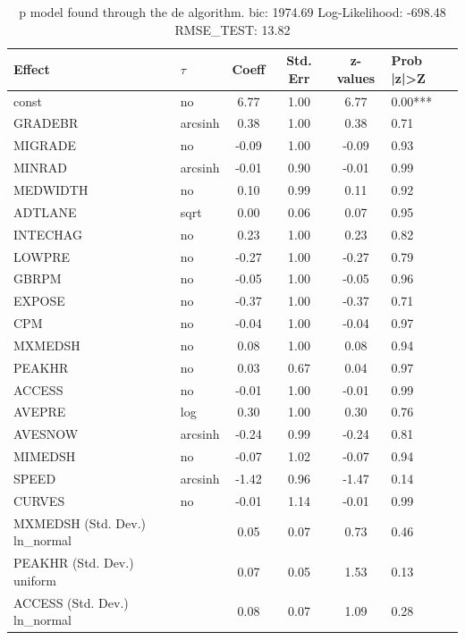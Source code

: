 \begin{table}
	\caption{p model found through the de algorithm. bic: 1974.69 Log-Likelihood: -698.48 RMSE_TEST: 13.82}
	\begin{center}
		\begin{tabular}{|l|l|c|c|c|l|}
			\hline
			Effect & $\tau$ & Coeff & Std. Err & z-values & Prob |z|>Z \\
			\hline
			const & no & 6.77 & 1.00 & 6.77 & 0.00*** \\
			\hline
			GRADEBR & arcsinh & 0.38 & 1.00 & 0.38 & 0.71 \\
			\hline
			MIGRADE & no & -0.09 & 1.00 & -0.09 & 0.93 \\
			\hline
			MINRAD & arcsinh & -0.01 & 0.90 & -0.01 & 0.99 \\
			\hline
			MEDWIDTH & no & 0.10 & 0.99 & 0.11 & 0.92 \\
			\hline
			ADTLANE & sqrt & 0.00 & 0.06 & 0.07 & 0.95 \\
			\hline
			INTECHAG & no & 0.23 & 1.00 & 0.23 & 0.82 \\
			\hline
			LOWPRE & no & -0.27 & 1.00 & -0.27 & 0.79 \\
			\hline
			GBRPM & no & -0.05 & 1.00 & -0.05 & 0.96 \\
			\hline
			EXPOSE & no & -0.37 & 1.00 & -0.37 & 0.71 \\
			\hline
			CPM & no & -0.04 & 1.00 & -0.04 & 0.97 \\
			\hline
			MXMEDSH & no & 0.08 & 1.00 & 0.08 & 0.94 \\
			\hline
			PEAKHR & no & 0.03 & 0.67 & 0.04 & 0.97 \\
			\hline
			ACCESS & no & -0.01 & 1.00 & -0.01 & 0.99 \\
			\hline
			AVEPRE & log & 0.30 & 1.00 & 0.30 & 0.76 \\
			\hline
			AVESNOW & arcsinh & -0.24 & 0.99 & -0.24 & 0.81 \\
			\hline
			MIMEDSH & no & -0.07 & 1.02 & -0.07 & 0.94 \\
			\hline
			SPEED & arcsinh & -1.42 & 0.96 & -1.47 & 0.14 \\
			\hline
			CURVES & no & -0.01 & 1.14 & -0.01 & 0.99 \\
			\hline
			MXMEDSH (Std. Dev.) ln_normal &  & 0.05 & 0.07 & 0.73 & 0.46 \\
			\hline
			PEAKHR (Std. Dev.) uniform &  & 0.07 & 0.05 & 1.53 & 0.13 \\
			\hline
			ACCESS (Std. Dev.) ln_normal &  & 0.08 & 0.07 & 1.09 & 0.28 \\

\end{tabular}
\end{center}
\end{table}

